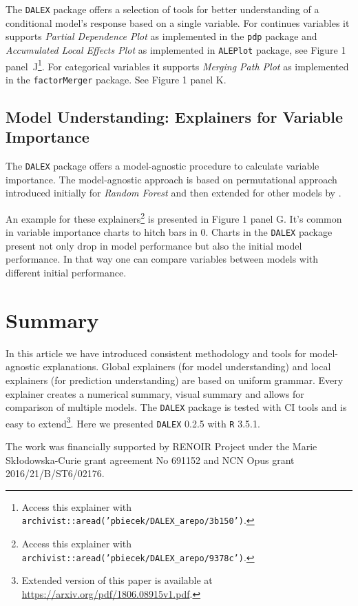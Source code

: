 \documentclass[twoside,11pt]{article}
\begin{document}
The \texttt{DALEX} package offers a selection of tools for better understanding of a  conditional model's response based on a single variable. 
For continues variables it supports \textit{Partial Dependence Plot} \citep{pdp} as implemented in the \texttt{pdp} package and  \textit{Accumulated Local Effects Plot} \citep{ALEPlot} as implemented in \texttt{ALEPlot} package, see Figure 1 panel~J\footnote{Access this explainer with  \texttt{archivist::aread('pbiecek/DALEX\_arepo/3b150')}.}.
For categorical variables it supports \textit{Merging Path Plot} \citep{factorMerger} as implemented in the \texttt{factorMerger} package. See Figure 1 panel K.

\subsection{Model Understanding: Explainers for Variable Importance}

The \texttt{DALEX} package offers a model-agnostic procedure to calculate variable importance. The model-agnostic approach is based on permutational approach introduced initially for \textit{Random Forest} \citep{Breiman2001} and then extended for other models by \cite{Fisher2018}.

An example for these explainers\footnote{Access this explainer with \texttt{archivist::aread('pbiecek/DALEX\_arepo/9378c')}.} is presented in Figure 1 panel G. It's common in variable importance charts to hitch bars in 0. 
Charts in the \texttt{DALEX} package present not only drop in model performance but also the initial model performance. In that way one can compare variables between models with different initial performance.


\section{Summary}


In this article we have introduced consistent methodology and tools for model-agnostic explanations. Global explainers (for model understanding) and local explainers (for prediction understanding) are based on uniform grammar. Every explainer creates a numerical summary, visual summary and allows for comparison of multiple models. The \texttt{DALEX} package is tested with CI tools and is easy to extend\footnote{Extended version of this paper is available at \url{https://arxiv.org/pdf/1806.08915v1.pdf}.}. Here we presented \texttt{DALEX}  0.2.5 with \texttt{R} 3.5.1.

\acks

The work was financially supported by RENOIR Project under the Marie Sk\l odowska-Curie grant agreement No 691152 and NCN Opus grant 2016/21/B/ST6/02176.

\setlength{\bibsep}{4pt plus 0.3ex}

\vskip 0.2in

\end{document}
